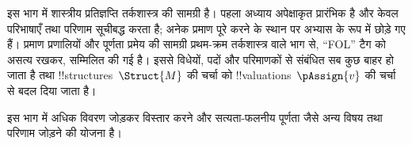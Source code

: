 \documentclass[../../include/open-logic-part]{subfiles}
\begin{document}

\begin{editorial}
  इस भाग में शास्त्रीय प्रतिज्ञप्ति तर्कशास्त्र की सामग्री है। पहला अध्याय
  अपेक्षाकृत प्रारंभिक है और केवल परिभाषाएँ तथा परिणाम सूचीबद्ध करता है;
  अनेक प्रमाण पूरे करने के स्थान पर अभ्यास के रूप में छोड़े गए हैं। प्रमाण
  प्रणालियों और पूर्णता प्रमेय की सामग्री प्रथम-क्रम तर्कशास्त्र वाले भाग से,
  ``FOL'' टैग को असत्य रखकर, सम्मिलित की गई है। इससे विधेयों, पदों और परिमाणकों
  से संबंधित सब कुछ बाहर हो जाता है तथा !!{structure}s~$\Struct{M}$ की चर्चा
  को !!{valuation}s~$\pAssign{v}$ की चर्चा से बदल दिया जाता है।

  इस भाग में अधिक विवरण जोड़कर विस्तार करने और सत्यता-फलनीय पूर्णता जैसे अन्य
  विषय तथा परिणाम जोड़ने की योजना है।
\end{editorial}










\OLEndPartHook
\end{document}
